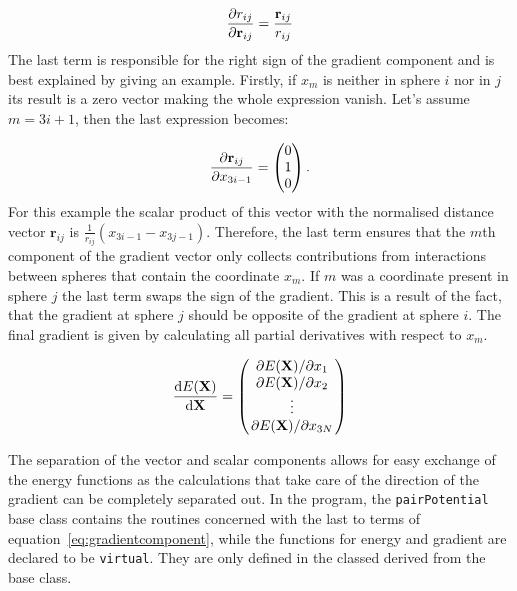 \begin{align}
    \pdv{r_{ij}}{\mathbf{r}_{ij}}=\frac{\mathbf{r}_{ij}}{r_{ij}}
\end{align}%
%
The last term is responsible for the right sign of the gradient component and
is best explained by giving an example. Firstly, if $x_m$ is neither in sphere
$i$ nor in $j$ its result is a zero vector making the whole expression vanish.
Let's assume $m=3i+1$, then the last expression becomes:

\begin{align}
    \pdv{\mathbf{r}_{ij}}{x_{3i-1}}=
    \begin{pmatrix}
        0\\1\\0
    \end{pmatrix}.
\end{align}%
%
For this example the scalar product of this vector with the normalised distance
vector $\mathbf{r}_{ij}$ is $\frac{1}{r_{ij}}(x_{3i-1} - x_{3j-1})$. Therefore,
the last term ensures that the $m$th component of the gradient vector only
collects contributions from interactions between spheres that contain the
coordinate $x_m$. If $m$ was a coordinate present in sphere $j$ the last term
swaps the sign of the gradient. This is a result of the fact, that the gradient
at sphere $j$ should be opposite of the gradient at sphere $i$. The final
gradient is given by calculating all partial derivatives with respect to $x_m$.

\begin{align}
    \dv{E(\mathbf{X})}{\mathbf{X}}=
    \begin{pmatrix}
        \pdv*{E(\mathbf{X})}{x_1}\\
        \pdv*{E(\mathbf{X})}{x_2}\\
        \vdots\\
        \pdv*{E(\mathbf{X})}{x_{3N}}
    \end{pmatrix}
\end{align}

The separation of the vector and scalar components allows for easy exchange of
the energy functions as the calculations that take care of the direction of the
gradient can be completely separated out. In the program, the
\texttt{pairPotential} base class contains the routines concerned with the last
to terms of equation~\eqref{eq:gradientcomponent}, while the functions for
energy and gradient are declared to be \texttt{virtual}. They are only defined
in the classed derived from the base class.

